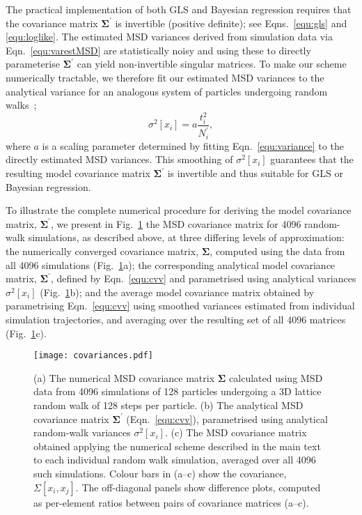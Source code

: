 \documentclass[reprint,superscriptaddress,nobibnotes,amsmath,amssymb,aps,prx,hidelinks,linenumbers]{revtex4-2}
\newcommand{\oMSDi}{\ensuremath{x_i}}
\newcommand{\oMSDj}{\ensuremath{x_j}}
\newcommand{\nind}[1]{\ensuremath{N^\prime_{#1}}}
\newcommand{\var}[1]{\ensuremath{\sigma^2[#1]}}
\begin{document}
The practical implementation of both GLS and Bayesian regression requires that the covariance matrix $\mathbf{\Sigma^\prime}$ is invertible (positive definite); see Eqns.~\ref{equ:gls} and \ref{equ:loglike}.
The estimated MSD variances derived from simulation data via Eqn.~\ref{equ:varestMSD} are statistically noisy and using these to directly parameterise $\mathbf{\Sigma^\prime}$ can yield non-invertible singular matrices.
To make our scheme numerically tractable, we therefore fit our estimated MSD variances to the analytical variance for an analogous system of particles undergoing random walks~\cite{smith_random_1996};
%
\begin{equation}
    \var{\oMSDi} = a\frac{t^2_i}{\nind{i}},
    \label{equ:variance}
\end{equation}
%
where $a$ is a scaling parameter determined by fitting Eqn.~\ref{equ:variance} to the directly estimated MSD variances.
This smoothing of $\var{\oMSDi}$ guarantees that the resulting model covariance matrix $\mathbf{\Sigma^\prime}$ is invertible and thus suitable for GLS or Bayesian regression.

To illustrate the complete numerical procedure for deriving the model covariance matrix, $\bm{\Sigma^\prime}$, we present in Fig.~\ref{fig:covariances} the MSD covariance matrix for \num{4096} random-walk simulations, as described above, at three differing levels of approximation:
the numerically converged covariance matrix, $\bm{\Sigma}$, computed using the data from all \num{4096} simulations (Fig.~\ref{fig:covariances}a);
the corresponding analytical model covariance matrix, $\mathbf{\Sigma^\prime}$, defined by Eqn.~\ref{equ:cvv} and parametrised using analytical variances $\var{\oMSDi}$ (Fig.~\ref{fig:covariances}b); and the average model covariance matrix obtained by parametrising Eqn.~\ref{equ:cvv} using smoothed variances estimated from individual simulation trajectories, and averaging over the resulting set of all \num{4096} matrices (Fig.~\ref{fig:covariances}c).

\begin{figure}
    \centering
    \texttt{[image: covariances.pdf]}
    \caption{
        (a) The numerical MSD covariance matrix $\bm{\Sigma}$ calculated using MSD data from \num{4096} simulations of \num{128} particles undergoing a 3D lattice random walk of \num{128} steps per particle.
        (b) The analytical MSD covariance matrix $\bm{\Sigma^\prime}$ (Eqn.~\ref{equ:cvv}), parametrised using analytical random-walk variances $\var{\oMSDi}$.
        (c) The MSD covariance matrix obtained applying the numerical scheme described in the main text to each individual random walk simulation, averaged over all \num{4096} such simulations.
        Colour bars in (a--c) show the covariance, $\Sigma\left[\oMSDi, \oMSDj\right]$.
        The off-diagonal panels show difference plots, computed as per-element ratios between pairs of covariance matrices (a--c).
    }
    \label{fig:covariances}
\end{figure}
\end{document}
